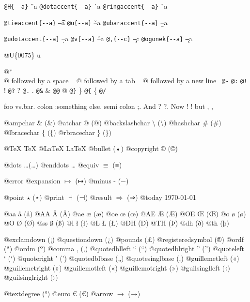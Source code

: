 \documentclass{book}
\renewcommand{\_}{\Texinfounderscore\discretionary{}{}{}}
\begin{document}
\begin{titlepage}
\texttt{@H\{{-}{-}a\}} \H{--a}
\texttt{@dotaccent\{{-}{-}a\}} \.{--a}
\texttt{@ringaccent\{{-}{-}a\}} \r{--a}

\texttt{@tieaccent\{{-}{-}a\}} \t{--a}
\texttt{@u\{{-}{-}a\}} \u{--a}
\texttt{@ubaraccent\{{-}{-}a\}} \b{--a}

\texttt{@udotaccent\{{-}{-}a\}} \d{--a}
\texttt{@v\{{-}{-}a\}} \v{--a}
\texttt{@,\{{-}{-}c\}} \c{--c}
\texttt{@ogonek\{{-}{-}a\}} \k{--a}

@U\{0075\} u

@* \leavevmode{}\\
@ followed by a space
\ {}
@ followed by a tab
\ {}
@ followed by a new line
\ {}\texttt{@-} \-{}
\texttt{@:} \@
\texttt{@!} \@!
\texttt{@?} \@?
\texttt{@.} \@.
\texttt{@\&} \&
\texttt{@@} @
\texttt{@\}} \}
\texttt{@\{} \{
\texttt{@/} 

foo vs.\@ bar. 
colon :\@And something else.
semi colon ;\@.
And ? ?\@.
Now ! !\@@
but , ,\@

@ampchar \& (\&)
@atchar @ (@)
@backslashchar \textbackslash{} (\textbackslash{})
@hashchar \# (\#)
@lbracechar \{ (\{)
@rbracechar \} (\})

@TeX \TeX{}
@LaTeX \LaTeX{}
@bullet \textbullet{} (•)
@copyright \copyright{} (©)

@dots \dots{}\@ (…)
@enddots \dots{}
@equiv $\equiv{}$ (≡)

@error 
@expansion $\mapsto{}$ (↦)
@minus - (−)

@point $\star{}$ (⋆)
@print $\dashv{}$ (⊣)
@result $\Rightarrow{}$ (⇒)
@today \today{}

@aa \aa{} (å)
@AA \AA{} (Å)
@ae \ae{} (æ)
@oe \oe{} (œ)
@AE \AE{} (Æ)
@OE \OE{} (Œ)
@o \o{} (ø)
@O \O{} (Ø)
@ss \ss{} (ß)
@l \l{} (ł)
@L \L{} (Ł)
@DH \DH{} (Ð)
@TH \TH{} (Þ)
@dh \dh{} (ð)
@th \th{} (þ)

@exclamdown \textexclamdown{} (¡)
@questiondown \textquestiondown{} (¿)
@pounds \textsterling{} (£)
@registeredsymbol \circledR{} (®)
@ordf \textordfeminine{} (ª)
@ordm \textordmasculine{} (º)
@comma , (,)
@quotedblleft \textquotedblleft{} (“)
@quotedblright \textquotedblright{} (”)
@quoteleft \textquoteleft{} (‘)
@quoteright \textquoteright{} (’)
@quotedblbase \quotedblbase{} („)
@quotesinglbase \quotesinglbase{} (‚)
@guillemetleft \guillemotleft{} («)
@guillemetright \guillemotright{} (»)
@guillemotleft \guillemotleft{} («)
@guillemotright \guillemotright{} (»)
@guilsinglleft \guilsinglleft{} (‹)
@guilsinglright \guilsinglright{} (›)

@textdegree \textdegree{} (°)
@euro \euro{} (€)
@arrow $\rightarrow{}$ (→)


\end{titlepage}
\end{document}
